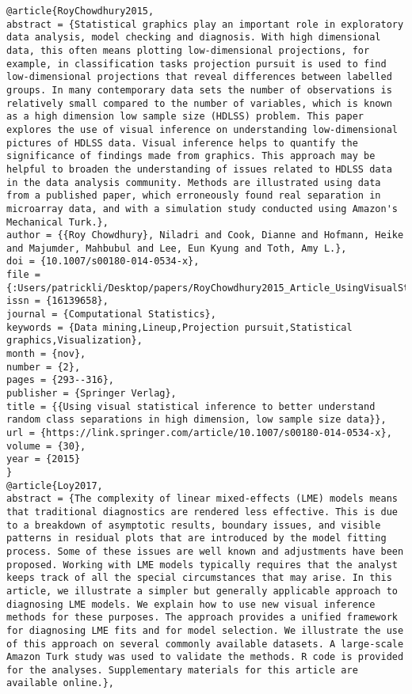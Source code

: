 \documentclass[
]{book}
\begin{document}
\begin{verbatim}
@article{RoyChowdhury2015,
abstract = {Statistical graphics play an important role in exploratory data analysis, model checking and diagnosis. With high dimensional data, this often means plotting low-dimensional projections, for example, in classification tasks projection pursuit is used to find low-dimensional projections that reveal differences between labelled groups. In many contemporary data sets the number of observations is relatively small compared to the number of variables, which is known as a high dimension low sample size (HDLSS) problem. This paper explores the use of visual inference on understanding low-dimensional pictures of HDLSS data. Visual inference helps to quantify the significance of findings made from graphics. This approach may be helpful to broaden the understanding of issues related to HDLSS data in the data analysis community. Methods are illustrated using data from a published paper, which erroneously found real separation in microarray data, and with a simulation study conducted using Amazon's Mechanical Turk.},
author = {{Roy Chowdhury}, Niladri and Cook, Dianne and Hofmann, Heike and Majumder, Mahbubul and Lee, Eun Kyung and Toth, Amy L.},
doi = {10.1007/s00180-014-0534-x},
file = {:Users/patrickli/Desktop/papers/RoyChowdhury2015_Article_UsingVisualStatisticalInferenc.pdf:pdf},
issn = {16139658},
journal = {Computational Statistics},
keywords = {Data mining,Lineup,Projection pursuit,Statistical graphics,Visualization},
month = {nov},
number = {2},
pages = {293--316},
publisher = {Springer Verlag},
title = {{Using visual statistical inference to better understand random class separations in high dimension, low sample size data}},
url = {https://link.springer.com/article/10.1007/s00180-014-0534-x},
volume = {30},
year = {2015}
}
@article{Loy2017,
abstract = {The complexity of linear mixed-effects (LME) models means that traditional diagnostics are rendered less effective. This is due to a breakdown of asymptotic results, boundary issues, and visible patterns in residual plots that are introduced by the model fitting process. Some of these issues are well known and adjustments have been proposed. Working with LME models typically requires that the analyst keeps track of all the special circumstances that may arise. In this article, we illustrate a simpler but generally applicable approach to diagnosing LME models. We explain how to use new visual inference methods for these purposes. The approach provides a unified framework for diagnosing LME fits and for model selection. We illustrate the use of this approach on several commonly available datasets. A large-scale Amazon Turk study was used to validate the methods. R code is provided for the analyses. Supplementary materials for this article are available online.},

\end{verbatim}
\end{document}
